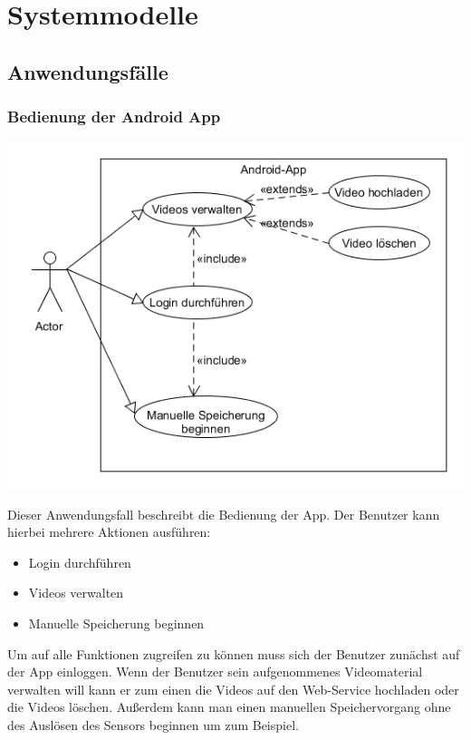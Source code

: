 \chapter{Systemmodelle}
\section{Anwendungsfälle}
\subsection{Bedienung der Android App}
\begin{center}
\includegraphics[width=1\textwidth]{subtopicsFuncspec/Res/systemModels/App-AFD-UML.png}
\end{center}
Dieser Anwendungsfall beschreibt die Bedienung der App. 
Der Benutzer kann hierbei mehrere Aktionen ausführen:
\begin{itemize}
\item Login durchführen
\item Videos verwalten
\item Manuelle Speicherung beginnen
\end{itemize}
Um auf alle Funktionen zugreifen zu können muss sich der Benutzer zunächst auf der App einloggen. 
Wenn der Benutzer sein aufgenommenes Videomaterial verwalten will kann er zum einen die Videos auf den Web-Service hochladen oder die Videos löschen.
Außerdem kann man einen manuellen Speichervorgang ohne des Auslösen des Sensors beginnen um zum Beispiel.

